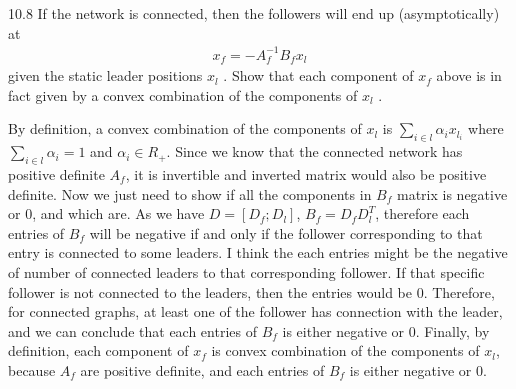 \documentclass{article}
\begin{document}
\newpage
\begin{problem} 10.8
    If the network is connected, then the followers will end up (asymptotically) at
    \begin{align*}
        x_f = -A_f^{-1} B_f x_l
    \end{align*}
    given the static leader positions $x_l$ . Show that each component of $x_f$ above is in fact given by a convex combination of the components of $x_l$ .

    By definition, a convex combination of the components of $x_l$ is $\sum_{i\in l}\alpha_i x_{l_i}$ where $\sum_{i\in l} \alpha_i = 1$ and $\alpha_i \in R_+ $. Since we know that the connected network has positive definite $A_f$, it is invertible and inverted matrix would also be positive definite. Now we just need to show if all the components in $B_f$ matrix is negative or 0, and which are. As we have $D = [D_f; D_l]$, $B_f = D_f D_l^T$, therefore each entries of $B_f$ will be negative if and only if the follower corresponding to that entry is connected to some leaders. I think the each entries might be the negative of number of connected leaders to that corresponding follower. If that specific follower is not connected to the leaders, then the entries would be 0. Therefore, for connected graphs, at least one of the follower has connection with the leader, and we can conclude that each entries of $B_f$ is either negative or 0. Finally, by definition, each component of $x_f$ is convex combination of the components of $x_l$, because $A_f$ are positive definite, and each entries of $B_f$ is either negative or 0.  
\end{problem}
\end{document}
